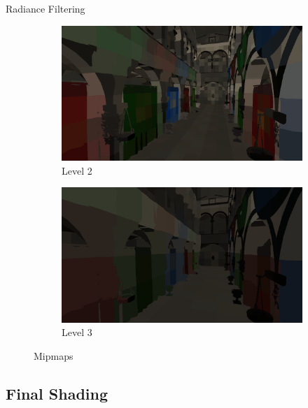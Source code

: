 \documentclass[10pt]{beamer}
\begin{document}
\begin{frame}{Radiance Filtering}
\begin{figure}
    \begin{subfigure}[b]{0.475\textwidth}
        \centering
        \includegraphics[width=\textwidth]{mipmap2.png}
        \caption*{Level 2}
    \end{subfigure}
    \quad
    \begin{subfigure}[b]{0.475\textwidth}
        \centering
        \includegraphics[width=\textwidth]{mipmap3.png}
        \caption*{Level 3}
    \end{subfigure}
    \caption*{Mipmaps}
  \end{figure}
\end{frame}

\subsection{Final Shading}

\end{document}
